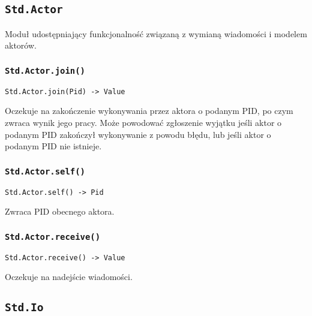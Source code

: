 \subsection{\texttt{Std.Actor}}
\label{stdlib_Std_Actor}

Moduł udostępniający funkcjonalność związaną z wymianą wiadomości i modelem aktorów.

\subsubsection{\texttt{Std.Actor.join()}}
\label{Std_Actor_join}

\begin{small}
\begin{lstlisting}
Std.Actor.join(Pid) -> Value
\end{lstlisting}
\end{small}

Oczekuje na zakończenie wykonywania przez aktora o podanym PID, po czym zwraca wynik jego pracy.
Może powodować zgłoszenie wyjątku jeśli aktor o podanym PID zakończył wykonywanie z powodu błędu, lub jeśli aktor
o podanym PID nie istnieje.

\subsubsection{\texttt{Std.Actor.self()}}

\begin{small}
\begin{lstlisting}
Std.Actor.self() -> Pid
\end{lstlisting}
\end{small}

Zwraca PID obecnego aktora.

\subsubsection{\texttt{Std.Actor.receive()}}

\begin{small}
\begin{lstlisting}
Std.Actor.receive() -> Value
\end{lstlisting}
\end{small}

Oczekuje na nadejście wiadomości.

\subsection{\texttt{Std.Io}}
\label{stdlib_Std_Io}

